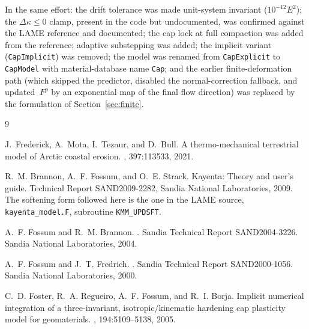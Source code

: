 \documentclass[12pt]{article}
\newcommand{\Fplas}{{~F^p}}
\begin{document}
In the same effort: the drift tolerance was made unit-system
invariant ($10^{-12} E^2$); the $\Delta\kappa \le 0$ clamp, present
in the code but undocumented, was confirmed against the LAME
reference and documented; the cap lock at full compaction was added
from the reference; adaptive substepping was added; the implicit
variant (\texttt{CapImplicit}) was removed; the model was renamed
from \texttt{CapExplicit} to \texttt{CapModel} with material-database
name \texttt{Cap}; and the earlier finite-deformation path (which
skipped the predictor, disabled the normal-correction fallback, and
updated $\Fplas$ by an exponential map of the final flow direction)
was replaced by the formulation of Section~\ref{sec:finite}.

\begin{thebibliography}{9}

J.~Frederick, A.~Mota, I.~Tezaur, and D.~Bull.
\newblock A thermo-mechanical terrestrial model of {Arctic} coastal erosion.
, 397:113533,
  2021.

R.~M. Brannon, A.~F. Fossum, and O.~E. Strack.
\newblock Kayenta: Theory and user's guide.
\newblock Technical Report SAND2009-2282, Sandia National Laboratories, 2009.
\newblock The softening form followed here is the one in the LAME source,
  \texttt{kayenta\_model.F}, subroutine \texttt{KMM\_UPDSFT}.

A.~F. Fossum and R.~M. Brannon.
.
\newblock Sandia Technical Report SAND2004-3226. Sandia National Laboratories,
  2004.

A.~F. Fossum and J.~T. Fredrich.
.
\newblock Sandia Technical Report SAND2000-1056. Sandia National Laboratories,
  2000.

C.~D. Foster, R.~A. Regueiro, A.~F. Fossum, and R.~I. Borja.
\newblock Implicit numerical integration of a three-invariant,
  isotropic/kinematic hardening cap plasticity model for geomaterials.
,
  194:5109--5138, 2005.


\end{thebibliography}
\end{document}
